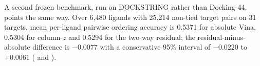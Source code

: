 A second frozen benchmark, run on DOCKSTRING rather than Docking-44, points the same way. Over
6{,}480 ligands with 25{,}214 non-tied
target pairs on 31 targets, mean per-ligand pairwise ordering accuracy is 0.5371 for absolute
Vina, 0.5304 for column-$z$ and 0.5294 for the two-way residual; the residual-minus-absolute
difference is $-0.0077$ with a conservative 95\% interval of $-0.0220$ to $+0.0061$
( and
).
